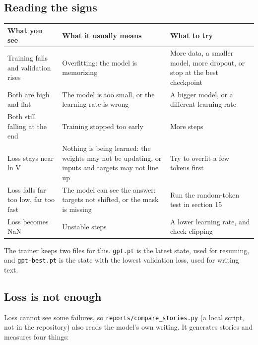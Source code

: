 \documentclass[11pt,a4paper]{article}
\newcommand{\code}[1]{\texttt{#1}}
\begin{document}
\subsection*{Reading the signs}
{}

{\small
\begin{longtable}{@{}>{\raggedright\arraybackslash}p{}>{\raggedright\arraybackslash}p{}>{\raggedright\arraybackslash}p{}@{}}
\toprule
\textbf{What you see} & \textbf{What it usually means} & \textbf{What to try} \\
\midrule
\endhead
Training falls and validation rises & Overfitting: the model is memorizing & More data, a smaller model, more dropout, or stop at the best checkpoint \\
Both are high and flat & The model is too small, or the learning rate is wrong & A bigger model, or a different learning rate \\
Both still falling at the end & Training stopped too early & More steps \\
Loss stays near ln V & Nothing is being learned: the weights may not be updating, or inputs and targets may not line up & Try to overfit a few tokens first \\
Loss falls far too low, far too fast & The model can see the answer: targets not shifted, or the mask is missing & Run the random-token test in section 15 \\
Loss becomes NaN & Unstable steps & A lower learning rate, and check clipping \\
\bottomrule
\end{longtable}
}

The trainer keeps two files for this. \code{gpt.\allowbreak{}pt} is the latest state, used for resuming, and \code{gpt-best.\allowbreak{}pt} is the state with the lowest validation loss, used for writing text.

\subsection*{Loss is not enough}
{}

Loss cannot see some failures, so \code{reports/\allowbreak{}compare\_\allowbreak{}stories.\allowbreak{}py} (a local script, not in the repository) also reads the model's own writing. It generates stories and measures four things:
\end{document}

